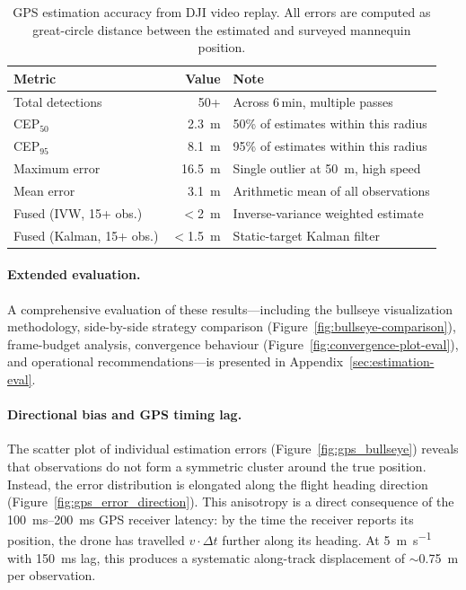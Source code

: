 \begin{table}[ht]
  \centering
  \caption{GPS estimation accuracy from DJI video replay.  All errors are computed as great-circle distance between the estimated and surveyed mannequin position.}
  \label{tab:dji-results}
  \begin{tabular}{lrl}
    \toprule
    \textbf{Metric} & \textbf{Value} & \textbf{Note} \\
    \midrule
    Total detections           & 50+                    & Across 6\,min, multiple passes \\
    CEP$_{50}$                 & \SI{2.3}{\metre}       & 50\% of estimates within this radius \\
    CEP$_{95}$                 & \SI{8.1}{\metre}       & 95\% of estimates within this radius \\
    Maximum error              & \SI{16.5}{\metre}      & Single outlier at \SI{50}{\metre}, high speed \\
    Mean error                 & \SI{3.1}{\metre}       & Arithmetic mean of all observations \\
    Fused (IVW, 15+ obs.)     & $<$\SI{2}{\metre}      & Inverse-variance weighted estimate \\
    Fused (Kalman, 15+ obs.)  & $<$\SI{1.5}{\metre}    & Static-target Kalman filter \\
    \bottomrule
  \end{tabular}
\end{table}

\paragraph{Extended evaluation.}
A comprehensive evaluation of these results---including the bullseye visualization methodology, side-by-side strategy comparison (Figure~\ref{fig:bullseye-comparison}), frame-budget analysis, convergence behaviour (Figure~\ref{fig:convergence-plot-eval}), and operational recommendations---is presented in Appendix~\ref{sec:estimation-eval}.

\paragraph{Directional bias and GPS timing lag.}
The scatter plot of individual estimation errors (Figure~\ref{fig:gps_bullseye}) reveals that observations do not form a symmetric cluster around the true position.  Instead, the error distribution is elongated along the flight heading direction (Figure~\ref{fig:gps_error_direction}).  This anisotropy is a direct consequence of the \SIrange{100}{200}{\milli\second} GPS receiver latency: by the time the receiver reports its position, the drone has travelled $v \cdot \Delta t$ further along its heading.  At \SI{5}{\metre\per\second} with \SI{150}{\milli\second} lag, this produces a systematic along-track displacement of $\sim$\SI{0.75}{\metre} per observation.

